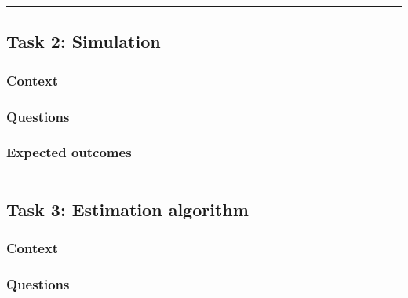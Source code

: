 \documentclass[]{book}
\theoremstyle{definition}
\theoremstyle{definition}
\theoremstyle{definition}
\theoremstyle{remark}
\begin{document}
\begin{center}\rule{0.5\linewidth}{\linethickness}\end{center}

\hypertarget{task-2-simulation-1}{%
\subsection*{Task 2: Simulation}\label{task-2-simulation-1}}

\hypertarget{context-10}{%
\subsubsection*{Context}\label{context-10}}

\hypertarget{questions-9}{%
\subsubsection*{Questions}\label{questions-9}}

\hypertarget{expected-outcomes-9}{%
\subsubsection*{Expected outcomes}\label{expected-outcomes-9}}

\begin{center}\rule{0.5\linewidth}{\linethickness}\end{center}

\hypertarget{task-3-estimation-algorithm}{%
\subsection*{Task 3: Estimation
algorithm}\label{task-3-estimation-algorithm}}

\hypertarget{context-11}{%
\subsubsection*{Context}\label{context-11}}

\hypertarget{questions-10}{%
\subsubsection*{Questions}\label{questions-10}}
\end{document}
